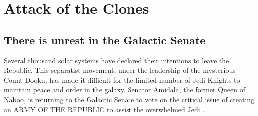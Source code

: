 \chapter{Attack of the Clones}	
\section{There is unrest in the Galactic Senate}
Several thousand solar systems have declared their intentions 
to leave the Republic. This separatist movement, under the 
leadership of the mysterious Count Dooku, has made it 
difficult for the limited number of Jedi Knights to maintain 
peace and order in the galaxy. Senator Amidala, the former 
Queen of Naboo, is returning to the Galactic Senate to vote 
on the critical issue of creating an ARMY OF THE REPUBLIC to 
assist the overwhelmed Jedi \cite{bib_amidala02, bib_palpatine02, bib_jarjar02, bib_anakin02, bib_dooku02}.

\lipsum[1-10]
